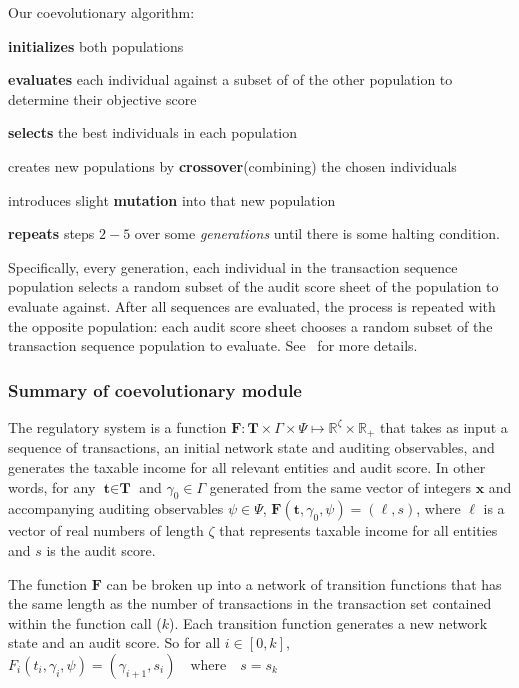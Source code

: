 Our coevolutionary algorithm:
\begin{asparaenum}[\itshape 1)]
\item \textbf{initializes} both populations
\item \textbf{evaluates} each individual against a subset of of the other
  population to determine their objective score
\item \textbf{selects} the best individuals in each population
\item creates new populations by \textbf{crossover}(combining) the
  chosen individuals
\item introduces slight \textbf{mutation} into that new population
\item \textbf{repeats} steps $2-5$ over some \textit{generations}
  until there is some halting condition.
\end{asparaenum}

Specifically, every generation, each individual in the transaction
sequence population selects a random subset of the audit score sheet
of the population to evaluate against. After all sequences are
evaluated, the process is repeated with the opposite population: each
audit score sheet chooses a random subset of the transaction sequence
population to evaluate. See~\cite{rosen2015thesis} for more details.

\subsubsection{Summary of coevolutionary module}

The regulatory system is a function $\textbf{F} : \textbf{T} \times
\Gamma \times \Psi \mapsto \mathbb{R}^{\zeta} \times \mathbb{R}_+$
that takes as input a sequence of transactions, an initial network
state and auditing observables, and generates the taxable income for
all relevant entities and audit score. In other words, for any
$\textbf{t} \in \textbf{T}$ and $\gamma_0 \in \Gamma$ generated from
the same vector of integers $\textbf{x}$ and accompanying auditing
observables $\psi \in \Psi$, $\textbf{F}\left(\textbf{t}, \gamma_0,
\psi \right) = \left({\bm \ell}, s \right)$, where ${\bm \ell}$ is a
vector of real numbers of length $\zeta$ that represents taxable
income for all entities and $s$ is the audit score.

The function $\textbf{F}$ can be broken up into a network of transition
functions that has the same length as the number of transactions in
the transaction set contained within the function call ($k$). Each
transition function generates a new network state and an audit score. So
for all $i \in [0,k]$, $F_i\left(t_i, \gamma_i, \psi \right) =
\left(\gamma_{i+1}, s_i \right) \quad \text{where} \quad s=s_k$



